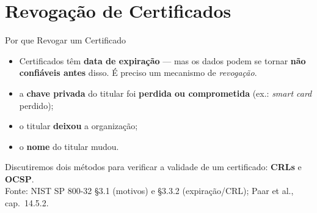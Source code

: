 \documentclass{beamer}
\begin{document}
\section{Revogação de Certificados}

\begin{frame}{Por que Revogar um Certificado}
    \begin{itemize}
        \item Certificados têm \textbf{data de expiração} --- mas os dados podem se tornar \textbf{não confiáveis antes} disso. É preciso um mecanismo de \emph{revogação}.
    \end{itemize}
    \medskip
    \begin{tcolorbox}[colback=red!5,colframe=red!60!black,boxrule=0.5pt,title=\footnotesize Motivos típicos de revogação (NIST SP 800-32 / livro)]
        \footnotesize
        \begin{itemize}
            \item a \textbf{chave privada} do titular foi \textbf{perdida ou comprometida} (ex.: \textit{smart card} perdido);
            \item o titular \textbf{deixou} a organização;
            \item o \textbf{nome} do titular mudou.
        \end{itemize}
    \end{tcolorbox}
    \medskip
    {\footnotesize Discutiremos dois métodos para verificar a validade de um certificado: \textbf{CRLs} e \textbf{OCSP}.}
    \smallskip\\
    {\tiny Fonte: NIST SP 800-32 §3.1 (motivos) e §3.3.2 (expiração/CRL); Paar et al., cap.\ 14.5.2.}
\end{frame}
\end{document}

